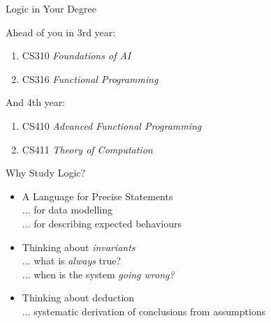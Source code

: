\documentclass[xetex,aspectratio=169,14pt,hyperref={pdfpagelabels=true,pdflang={en-GB}}]{beamer}
\begin{document}
\begin{frame}
  {Logic in Your Degree}

  Ahead of you in 3rd year:
  \begin{enumerate}
  \item CS310 \emph{Foundations of AI}
  \item CS316 \emph{Functional Programming}
  \end{enumerate}

  \medskip

  And 4th year:
  \begin{enumerate}
  \item CS410 \emph{Advanced Functional Programming}
  \item CS411 \emph{Theory of Computation}
  \end{enumerate}
\end{frame}

\begin{frame}
  {Why Study Logic?}

  \begin{itemize}
  \item A Language for Precise Statements \\
    ... for data modelling \\
    ... for describing expected behaviours
  \item Thinking about \emph{invariants} \\
    ... what is \emph{always} true? \\
    ... when is the system \emph{going wrong?}
  \item Thinking about deduction \\
    ... systematic derivation of conclusions from assumptions
  \end{itemize}
\end{frame}





\end{document}
